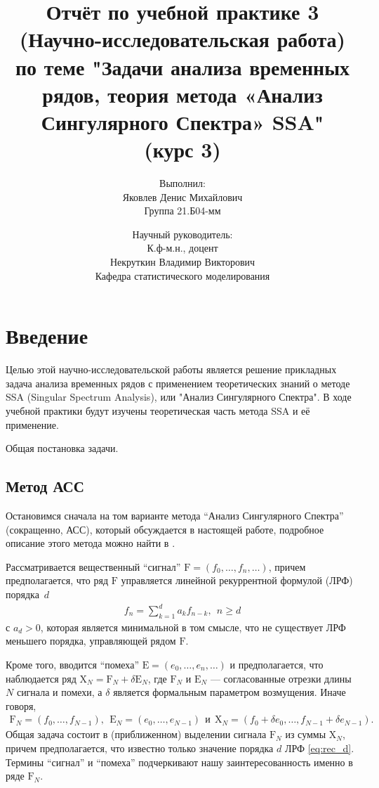 \documentclass[fleqn]{article}
\title{Отчёт по учебной практике 3 (Научно-исследовательская работа) по теме "Задачи анализа временных рядов, теория метода «Анализ Сингулярного Спектра» SSA"\\(курс 3)}
\author{Выполнил:\\ Яковлев Денис Михайлович\\ Группа 21.Б04-мм \and Научный руководитель:\\ К.ф-м.н., доцент\\ Некруткин Владимир Викторович\\ Кафедра статистического моделирования}
\begin{document}
	\maketitle
	\newpage
	\section{Введение}
	Целью этой научно-исследовательской работы является решение прикладных задача анализа временных рядов с применением теоретических знаний о методе SSA (Singular Spectrum Analysis), или "Анализ Сингулярного Спектра". В ходе учебной практики будут изучены теоретическая часть метода SSA и её применение.

Общая постановка задачи.%

\subsection{Метод АСС}
\label{ssect:SSA}
Остановимся сначала на том варианте метода ``Анализ Сингулярного Спектра'' (сокращенно, АСС), который обсуждается в настоящей работе,  подробное
описание этого  метода
можно найти в \cite{GNZh01}.

Рассматривается вещественный ``сигнал'' $\mathrm{F}=(f_0,\ldots, f_n,\ldots)$, причем предполагается, что ряд $\mathrm{F}$ управляется линейной
рекуррентной формулой  (ЛРФ) порядка~$d$
	\begin{gather}
\label{eq:rec_d}
	f_n = \sum\limits_{k=1}^d a_kf_{n-k}, \ \ n \geq d
	\end{gather}
с $a_d>0$, которая является минимальной в том смысле, что  не существует ЛРФ меньшего порядка, управляющей рядом $\mathrm{F}$.

Кроме того, вводится ``помеха'' $\mathrm{E}=(e_0,\ldots, e_n,\ldots)$ и предполагается, что наблюдается ряд $\mathrm{X}_N=\mathrm{F}_N+\delta
\mathrm{E}_N$, где  $\mathrm{F}_N$ и $\mathrm{E}_N$ --- согласованные отрезки длины $N$ сигнала и помехи, а
$\delta$ является формальным параметром возмущения. Иначе говоря,
\begin{gather*}
\mathrm{F}_N=(f_0, \ldots, f_{N-1}), \ \ \mathrm{E}_N=(e_0, \ldots, e_{N-1}) \ \ \text{и}\ \
\mathrm{X}_N=(f_0+\delta e_0, \ldots, f_{N-1}+\delta e_{N-1}).
\end{gather*}
 Общая  задача состоит в (приближенном) выделении сигнала $\mathrm{F}_N$ из суммы $\mathrm{X}_N$, причем предполагается, что известно только
 значение порядка $d$ ЛРФ \eqref{eq:rec_d}.
 Термины ``сигнал'' и ``помеха'' подчеркивают  нашу заинтересованность именно в ряде $\mathrm{F}_N$.
\end{document}

